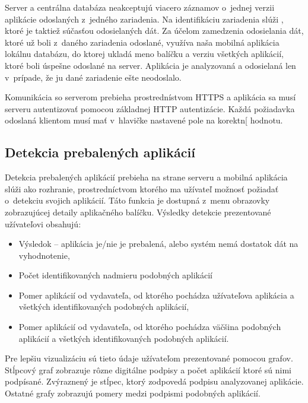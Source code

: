 Server a centrálna databáza neakceptujú viacero záznamov o~jednej verzii aplikácie odoslaných z~jedného zariadenia. Na identifikáciu zariadenia slúži , ktoré je taktiež súčasťou odosielaných dát. Za účelom zamedzenia odosielania dát, ktoré už boli z~daného zariadenia odoslané, využíva naša mobilná aplikácia lokálnu databázu, do ktorej ukladá meno balíčku a verziu všetkých aplikácií, ktoré boli úspešne odoslané na server. Aplikácia je analyzovaná a odosielaná len v~prípade, že ju dané zariadenie ešte neodoslalo.

Komunikácia so serverom prebieha prostrednístvom HTTPS a aplikácia sa musí serveru autentizovať pomocou základnej HTTP autentizácie. Každá požiadavka odoslaná klientom musí mať v~hlavičke nastavené pole  na korektn[ hodnotu.

\subsection{Detekcia prebalených aplikácií}
Detekcia prebalených aplikácií prebieha na strane serveru a mobilná aplikácia slúži ako rozhranie, prostredníctvom ktorého ma užívateľ možnosť požiadať o~detekciu svojich aplikácií. Táto funkcia je dostupná z~menu obrazovky zobrazujúcej detaily aplikačného balíčku. Výsledky detekcie prezentované užívateľovi obsahujú:
\begin{itemize}
	\item Výsledok -- aplikácia je/nie je prebalená, alebo systém nemá dostatok dát na vyhodnotenie,
	\item Počet identifikovaných nadmieru podobných aplikácií
	\item Pomer aplikácií od vydavateľa, od ktorého pochádza užívateľova aplikácia a všetkých identifikovaných podobných aplikácií,
	\item Pomer aplikácií od vydavateľa, od ktorého pochádza väčšina podobných aplikácií a všetkých identifikovaných podobných aplikácií.
\end{itemize}

Pre lepšiu vizualizáciu sú tieto údaje užívateľom prezentované pomocou grafov. Stĺpcový graf zobrazuje rôzne digitálne podpisy a počet aplikácií ktoré sú nimi podpísané. Zvýraznený je stĺpec, ktorý zodpovedá podpisu analyzovanej aplikácie. Ostatné grafy zobrazujú pomery medzi podpismi podobných aplikácií.

